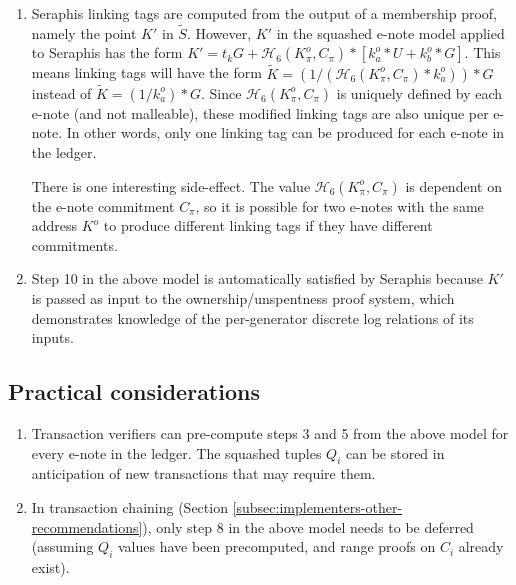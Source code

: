 \begin{appendices}
\begin{enumerate}
\begin{enumerate}
        [[[formal proof? this is giving me a lot of trouble]]]
    \end{enumerate}

    \item Seraphis linking tags are computed from the output of a membership proof, namely the point $K'$ in $\tilde{S}$. However, $K'$ in the squashed e-note model applied to Seraphis has the form $K' = t_k G + \mathcal{H}_6(K^o_{\pi}, C_{\pi})*[k^o_a*U + k^o_b*G]$. This means linking tags will have the form $\tilde{K} = (1/(\mathcal{H}_6(K^o_{\pi}, C_{\pi})*k^o_a))*G$ instead of $\tilde{K} = (1/k^o_a)*G$. Since $\mathcal{H}_6(K^o_{\pi}, C_{\pi})$ is uniquely defined by each e-note (and not malleable), these modified linking tags are also unique per e-note. In other words, only one linking tag can be produced for each e-note in the ledger.

    There is one interesting side-effect. The value $\mathcal{H}_6(K^o_{\pi}, C_{\pi})$ is dependent on the e-note commitment $C_{\pi}$, so it is possible for two e-notes with the same address $K^o$ to produce different linking tags if they have different commitments.

    \item Step 10 in the above model is automatically satisfied by Seraphis because $K'$ is passed as input to the ownership/unspentness proof system, which demonstrates knowledge of the per-generator discrete log relations of its inputs.
\end{enumerate}


\subsection{Practical considerations}
\label{appendix:squashed-e-note-model-practical-considerations}

\begin{enumerate}
    \item Transaction verifiers can pre-compute steps 3 and 5 from the above model for every e-note in the ledger. The squashed tuples $Q_i$ can be stored in anticipation of new transactions that may require them.

    \item In transaction chaining (Section \ref{subsec:implementers-other-recommendations}), only step 8 in the above model needs to be deferred (assuming $Q_i$ values have been precomputed, and range proofs on $C_i$ already exist).
\end{enumerate}




\end{appendices}
